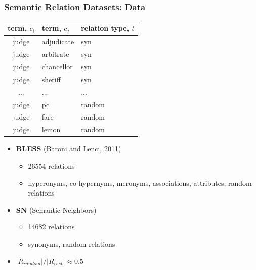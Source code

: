 \documentclass{beamer}
\begin{document}
\begin{frame}
\frametitle{Semantic Relation Datasets: Data}

{ \scriptsize

\begin{table}[h]\footnotesize
\begin{tabular}{ |c|l|l| }
\hline
term, $c_i$ & term, $c_j$ & relation type, $t$  \\ \hline \hline
judge & adjudicate & syn \\
judge & arbitrate & syn \\
judge & chancellor & syn \\
judge & sheriff & syn \\
... & ... & ...   \\
judge & pc & random \\ 
judge & fare & random \\
judge & lemon & random \\ \hline
\end{tabular}
\end {table}

}

\begin{itemize}
  \item \textbf{BLESS} (Baroni and Lenci, 2011)
  \begin{itemize}
    \item 26554 relations
    \item hyperonyms, co-hypernyms, meronyms, associations, attributes, random relations
    \end{itemize}  
  \item \textbf{SN} (Semantic Neighbors)
  \begin{itemize}
    \item 14682  relations\
    \item synonyms, random relations
    \end{itemize}
    
    \item $|R_{random}|/|R_{rest}| \approx 0.5$
     
\end{itemize}

\end{frame}
\end{document}
